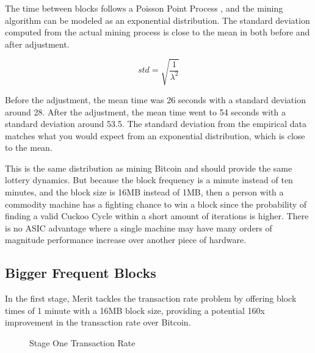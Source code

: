 \documentclass{article}
\begin{document}
The time between blocks follows a Poisson Point Process \cite{poisson}, and the
mining algorithm can be modeled as an exponential distribution.
The standard deviation computed from the actual mining process is close to the
mean in both before and after adjustment.

$$std=\sqrt{\frac{1}{\lambda^2}}$$

Before the adjustment, the mean time was 26 seconds with a standard deviation
around 28. After the adjustment, the mean time went to 54 seconds with a
standard deviation around 53.5. The standard deviation from the empirical data
matches what you would expect from an exponential distribution, which is
close to the mean.

This is the same distribution as mining Bitcoin \cite{bitpoisson} and should
provide the same lottery dynamics. But because the block frequency is a minute
instead of ten minutes, and the block size is 16MB instead of 1MB, then a person
with a commodity machine has a fighting chance to win a block since the probability
of finding a valid Cuckoo Cycle within a short amount of iterations is higher.
There is no ASIC advantage where a single machine may have many orders of magnitude
performance increase over another piece of hardware.

\subsection{Bigger Frequent Blocks}

In the first stage, Merit tackles the transaction rate problem by offering block times of 1 minute
with a 16MB block size, providing a potential 160x improvement in the transaction
rate over Bitcoin.

\begin{figure}[H]
    \begin{center}
    \end{center}
    \caption{Stage One Transaction Rate}
\end{figure}
\end{document}
